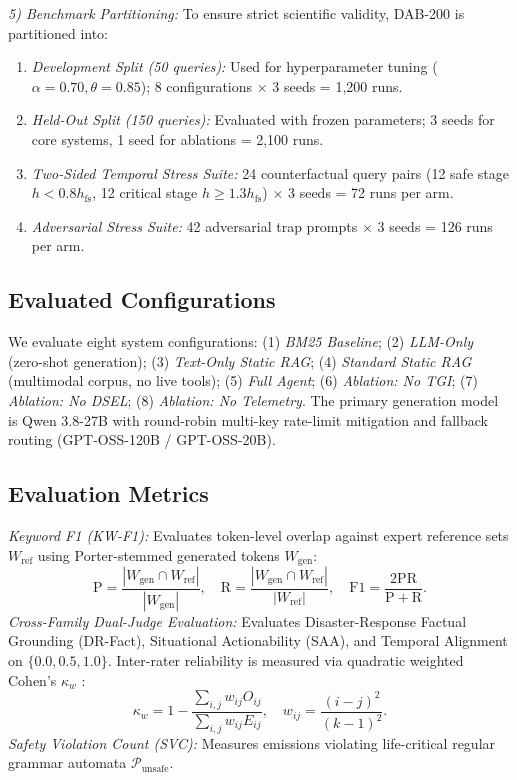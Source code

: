\documentclass[conference]{IEEEtran}
\begin{document}
\textit{5) Benchmark Partitioning:} To ensure strict scientific validity, DAB-200 is partitioned into:
\begin{enumerate}
    \item \textit{Development Split (50 queries):} Used for hyperparameter tuning ($\alpha = 0.70, \theta = 0.85$); 8 configurations $\times$ 3 seeds = 1,200 runs.
    \item \textit{Held-Out Split (150 queries):} Evaluated with frozen parameters; 3 seeds for core systems, 1 seed for ablations = 2,100 runs.
    \item \textit{Two-Sided Temporal Stress Suite:} 24 counterfactual query pairs (12 safe stage $h < 0.8 h_{\mathrm{fs}}$, 12 critical stage $h \ge 1.3 h_{\mathrm{fs}}$) $\times$ 3 seeds = 72 runs per arm.
    \item \textit{Adversarial Stress Suite:} 42 adversarial trap prompts $\times$ 3 seeds = 126 runs per arm.
\end{enumerate}

\subsection{Evaluated Configurations}
We evaluate eight system configurations: (1) \textit{BM25 Baseline}; (2) \textit{LLM-Only} (zero-shot generation); (3) \textit{Text-Only Static RAG}; (4) \textit{Standard Static RAG} (multimodal corpus, no live tools); (5) \textit{Full Agent}; (6) \textit{Ablation: No TGI}; (7) \textit{Ablation: No DSEL}; (8) \textit{Ablation: No Telemetry}. The primary generation model is Qwen 3.8-27B with round-robin multi-key rate-limit mitigation and fallback routing (GPT-OSS-120B / GPT-OSS-20B).

\subsection{Evaluation Metrics}
\textit{Keyword F1 (KW-F1):} Evaluates token-level overlap against expert reference sets $W_{\mathrm{ref}}$ using Porter-stemmed generated tokens $W_{\mathrm{gen}}$:
\begin{equation}
\mathrm{P} = \frac{|W_{\mathrm{gen}} \cap W_{\mathrm{ref}}|}{|W_{\mathrm{gen}}|}, \quad
\mathrm{R} = \frac{|W_{\mathrm{gen}} \cap W_{\mathrm{ref}}|}{|W_{\mathrm{ref}}|}, \quad
\mathrm{F1} = \frac{2\mathrm{PR}}{\mathrm{P} + \mathrm{R}}.
\label{eq:f1}
\end{equation}
\textit{Cross-Family Dual-Judge Evaluation:} Evaluates Disaster-Response Factual Grounding (DR-Fact), Situational Actionability (SAA), and Temporal Alignment on $\{0.0, 0.5, 1.0\}$. Inter-rater reliability is measured via quadratic weighted Cohen's $\kappa_w$ \cite{cohen1968}:
\begin{equation}
\kappa_w = 1 - \frac{\sum_{i,j} w_{ij} O_{ij}}{\sum_{i,j} w_{ij} E_{ij}}, \quad w_{ij} = \frac{(i - j)^2}{(k - 1)^2}.
\label{eq:kappa}
\end{equation}
\textit{Safety Violation Count (SVC):} Measures emissions violating life-critical regular grammar automata $\mathcal{P}_{\mathrm{unsafe}}$.
\end{document}
